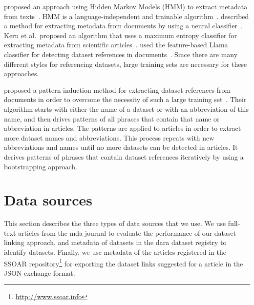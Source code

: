 \documentclass{IOS-Book-Article}
\newcommand{\dara}{\textsf{da\textbar ra}}
\begin{document}
\citeauthor{Cui2010} proposed an approach using Hidden Markov Models (HMM) to extract metadata from texts~\citeyearpar{Cui2010}. 
HMM is a language-independent and trainable algorithm~\cite{Kubala1998}.
\citeauthor{Marinai2009} described a method for extracting metadata from documents by using a neural classifier~\citeyearpar{Marinai2009}.
Kern et al.\ proposed an algorithm that uses a maximum entropy classifier for extracting metadata from scientific articles~\cite{Kern2012}.
\citeauthor{MeiyuLu2012} used the feature-based Llama classifier for detecting dataset references in documents~\citeyearpar{MeiyuLu2012}.
Since there are many different styles for referencing datasets, large training sets are necessary for these approaches.

\citeauthor{Boland2012} proposed a pattern induction method for extracting dataset references from documents in order to overcome the necessity of such a large training set~\citeyearpar{Boland2012}.
Their algorithm starts with either the name of a dataset or with an abbreviation of this name, and then drives patterns of all phrases that contain that name or abbreviation in articles.
The patterns are applied to articles in order to extract more dataset names and abbreviations.
This process repeats with new abbreviations and names until no more datasets can be detected in articles.
It derives patterns of phrases that contain dataset references iteratively by using a bootstrapping approach.

\section{Data sources}
\label{sec:data}
This section describes the three types of data sources that we use. We use full-text articles from the mda journal to evaluate the performance of our dataset linking approach, and metadata of datasets in the {\dara} dataset registry to identify datasets. 
Finally, we use metadata of the articles registered in the SSOAR repository\footnote{\url{http://www.ssoar.info}} for exporting the dataset links suggested for a article in the JSON exchange format.
 
\end{document}

